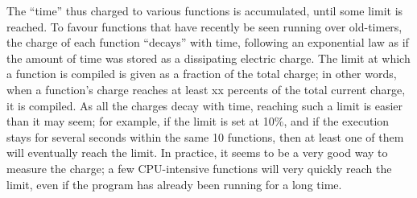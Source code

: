 \documentclass{manual}
\begin{document}
The ``time'' thus charged to various functions is accumulated, until some limit is reached.  To favour functions that have recently be seen running over old-timers, the charge of each function ``decays'' with time, following an exponential law as if the amount of time was stored as a dissipating electric charge.  The limit at which a function is compiled is given as a fraction of the total charge; in other words, when a function's charge reaches at least xx percents of the total current charge, it is compiled.  As all the charges decay with time, reaching such a limit is easier than it may seem; for example, if the limit is set at 10\%, and if the execution stays for several seconds within the same 10 functions, then at least one of them will eventually reach the limit.  In practice, it seems to be a very good way to measure the charge; a few CPU-intensive functions will very quickly reach the limit, even if the program has already been running for a long time.
\end{document}
